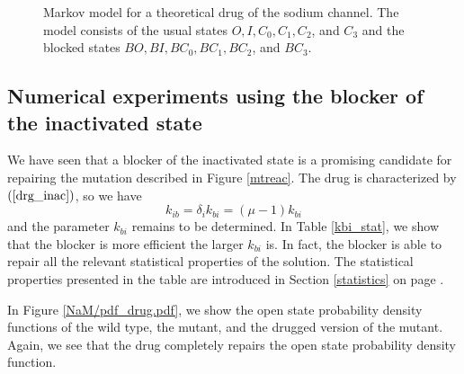 \begin{figure}[ptb]
\begin{center}
\end{center}
\caption{Markov model for a theoretical drug of the sodium channel. The model
consists of the usual states $O,I,C_{0},C_{1},C_{2}$, and $C_{3}$ and the blocked
states $BO,BI,BC_{0},BC_{1},BC_{2}$, and $BC_{3}$.}%
\label{mtreadr}%
\end{figure}




\subsection{Numerical experiments using the blocker of the inactivated state}

We have seen that a blocker of the inactivated state is a promising
candidate for repairing the mutation described in Figure \ref{mtreac}. The drug
is characterized by $\left(  \ref{drg_inac}\right)  $, so we have%
\begin{equation}
k_{ib}=\delta_{i}k_{bi}=\left(  \mu-1\right)  k_{bi} \label{kbi10}
\end{equation}
and the parameter $k_{bi}$ remains to be determined. In Table \ref{kbi_stat}, we show that the
blocker is more efficient the larger $k_{bi}$ is. In fact, the blocker is able to
repair all the relevant statistical properties of the solution. The statistical properties
presented in the table are introduced in Section \ref{statistics} on page \pageref{statistics}.


In Figure \ref{NaM/pdf_drug.pdf}, we show the open state probability density functions of the
wild type, the mutant, and the drugged version of the mutant. Again, we see
that the drug completely repairs the open state probability density function.

